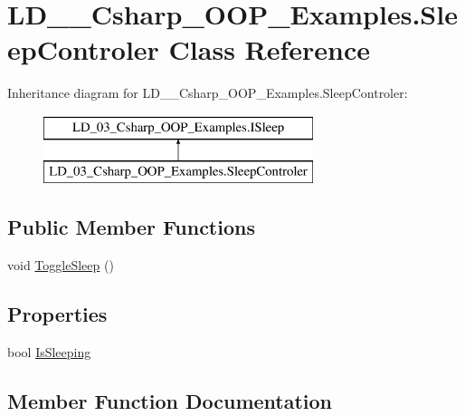 \hypertarget{class_l_d__03___csharp___o_o_p___examples_1_1_sleep_controler}{}\section{L\+D\+\_\+\_\+\+Csharp\+\_\+\+O\+O\+P\+\_\+\+Examples.\+Sleep\+Controler Class Reference}
\label{class_l_d__03___csharp___o_o_p___examples_1_1_sleep_controler}
Inheritance diagram for L\+D\+\_\+\_\+\+Csharp\+\_\+\+O\+O\+P\+\_\+\+Examples.\+Sleep\+Controler\+:\begin{figure}[H]
\begin{center}
\leavevmode
\includegraphics[height=2.000000cm]{class_l_d__03___csharp___o_o_p___examples_1_1_sleep_controler}
\end{center}
\end{figure}
\subsection*{Public Member Functions}
\begin{DoxyCompactItemize}
\item 
void \mbox{\hyperlink{class_l_d__03___csharp___o_o_p___examples_1_1_sleep_controler_ad8b90b3fa29e24828b2d739961458dba}{Toggle\+Sleep}} ()
\end{DoxyCompactItemize}
\subsection*{Properties}
\begin{DoxyCompactItemize}
\item 
bool \mbox{\hyperlink{class_l_d__03___csharp___o_o_p___examples_1_1_sleep_controler_ae68167d3360f4f9b0a7bec48ab64e898}{Is\+Sleeping}}
\end{DoxyCompactItemize}


\subsection{Member Function Documentation}
\mbox{\label{class_l_d__03___csharp___o_o_p___examples_1_1_sleep_controler_ad8b90b3fa29e24828b2d739961458dba}} 
